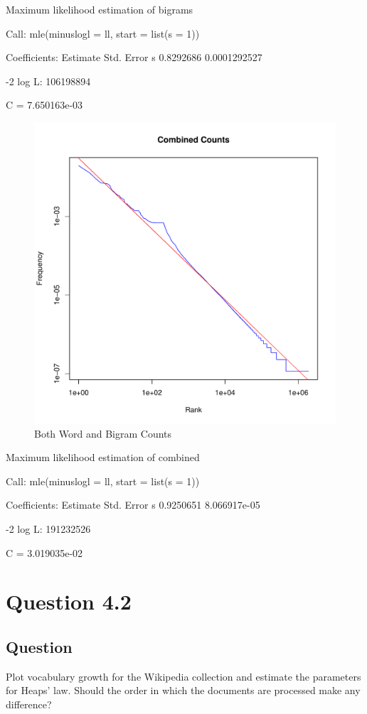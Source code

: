 \documentclass[10pt,letterpaper,bibliography=totoc]{scrartcl}
\begin{document}
Maximum likelihood estimation of bigrams

Call:
mle(minuslogl = ll, start = list(s = 1))

Coefficients:
   Estimate   Std. Error
s 0.8292686 0.0001292527

-2 log L: 106198894 

C = 7.650163e-03

\hfill \linebreak
\begin{figure}[!h]
\centering
\clearpage
\label{fig:both}
\includegraphics[scale=.5]{word_bigram.pdf}
\caption{Both Word and Bigram Counts }
\end{figure}

Maximum likelihood estimation of combined

Call:
mle(minuslogl = ll, start = list(s = 1))

Coefficients:
   Estimate   Std. Error
s 0.9250651 8.066917e-05

-2 log L: 191232526 

C = 3.019035e-02

\hfill \linebreak
\section{Question 4.2}
\subsection {Question}
Plot vocabulary growth for the Wikipedia collection and estimate the parameters for Heaps' law. Should the order in which the documents are processed make any difference?
\end{document}
